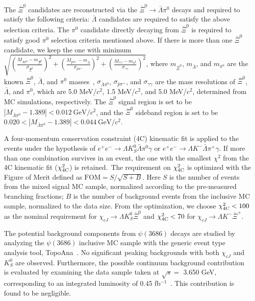 \documentclass[amsmath,amssymb,twocolumn,prd,floatfix,showpacs,nofootinbib]{revtex4-1}
\begin{document}
The $\bar \Xi^0$ candidates are reconstructed via the $\bar \Xi^0\to \bar \Lambda \pi^0$ decays and required to satisfy the following criteria:
$\bar \Lambda$ candidates are required to satisfy the above selection criteria.
The $\pi^0$ candidate directly decaying from $\bar \Xi^0$ is required to satisfy good $\pi^0$ selection criteria mentioned above.
If there is more than one $\bar \Xi^0$ candidate, we keep the one with minimum 	 
$\sqrt{ (\frac{M_{\bar \Lambda \pi^0}-m_{\bar{\Xi}^0}}{\sigma_{\bar{\Xi}^0}})^2+(\frac{M_{\bar{p}\pi^+}-m_{\bar{\Lambda}}}{\sigma_{\bar{p}\pi^+}})^2 + (\frac{M_{\gamma\gamma}-m_{\pi^0}}{\sigma_{\gamma\gamma}})^2}$, where $m_{\bar{\Xi}^0}$, $m_{\bar{\Lambda}}$, and $m_{\pi^0}$ are the known $\bar \Xi^0$, $\bar{\Lambda}$, and $\pi^0$ masses~\cite{ref::pdg2024}, $\sigma_{\bar{\Lambda}\pi^0}$, $\sigma_{\bar{p}\pi^+}$, and $\sigma_{\gamma\gamma}$ are the mass resolutions of $\bar\Xi^0$, $\bar{\Lambda}$, and $\pi^0$, which are 5.0 MeV/$c^2$, 1.5 MeV/$c^2$, and 5.0 MeV/$c^2$, determined from MC simulations, respectively.
The $\bar \Xi^0$ signal region is set to be $|M_{\bar \Lambda\pi^0}-1.389|<0.012~\mathrm{GeV}/c^2$, and the $\bar \Xi^0$ sideband region is set to be $0.020<|M_{\bar \Lambda\pi^0}-1.389|<0.044~\mathrm{GeV}/c^2$.

A four-momentum conservation constraint (4C) kinematic fit is applied to the events under the hypothesis of $ e^+e^-\to \Lambda K_S^0 \bar \Lambda \pi^0\gamma$ or $ e^+e^-\to \Lambda K^- \bar \Lambda \pi^+\gamma$. If more than one combination survives in an event, the one with the smallest $\chi^{2}$ from the 4C kinematic fit ($\chi_{\rm 4C}^{2}$) is retained.~The requirement on $\chi^2_{\rm 4C}$ is optimized with the Figure of Merit defined as $ \mathrm{FOM} = \mathit{S}/\sqrt{\mathit{S}+\mathit{B}}.$ Here $S$ is the number of events from the mixed signal MC sample, normalized according to the pre-measured branching fractions;
$B$ is the number of background events from the inclusive MC sample, normalized to the data size. From the optimization, we choose $\chi^2_{\rm 4C}<100$ as the nominal requirement for $\chi_{cJ}\to\Lambda K_S^0\bar{\Xi}^0 $ and $\chi^2_{\rm 4C}<70$ for $\chi_{cJ}\to\Lambda K^-\bar{\Xi}^+ $.

The potential background components from $\psi(3686)$ decays are studied by analyzing the $\psi(3686)$ inclusive MC sample with the generic event type analysis tool, TopoAna~\cite{topo}. No significant peaking backgrounds with both $\chi_{cJ}$ and $K^0_S$ are observed.
Furthermore, the possible continuum background contribution is
evaluated by examining the data sample taken at $\sqrt s =$ 3.650 GeV, corresponding to an integrated luminosity of 0.45 fb$^{-1}$~\cite{lum}.
This contribution is found to be negligible. 
\end{document}

